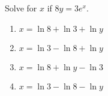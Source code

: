\bigskip

\item Solve for $x$ if $8y = 3e^x$.

\begin{enumerate}
\item $x = \ln 8 + \ln 3 + \ln y$
\item $x = \ln 3 - \ln 8 + \ln y$
\item $x = \ln 8 + \ln y - \ln 3$
\item $x = \ln 3 - \ln 8 - \ln y$
\end{enumerate}


